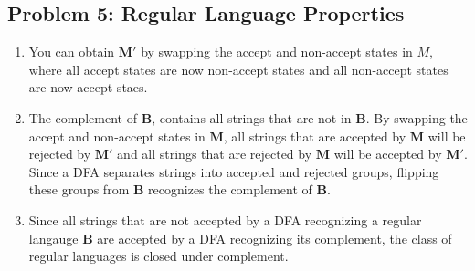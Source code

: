 \documentclass{article}
\begin{document}
\pagebreak

\subsection*{Problem 5: Regular Language Properties}

\begin{enumerate}[label=\Alph*.]
    \item You can obtain $\mathbf{M'}$ by swapping the accept and non-accept states in $M$, where all accept states are now non-accept states and all non-accept states are now accept staes.
    \item The complement of $\mathbf{B}$, contains all strings that are not in $\mathbf{B}$. By swapping the accept and non-accept states in $\mathbf{M}$, all strings that are accepted by $\mathbf{M}$ will be rejected by $\mathbf{M'}$ and all strings that are rejected by $\mathbf{M}$ will be accepted by $\mathbf{M'}$. Since a DFA separates strings into accepted and rejected groups, flipping these groups from $\mathbf{B}$ recognizes the complement of $\mathbf{B}$.
    \item Since all strings that are not accepted by a DFA recognizing a regular langauge $\mathbf{B}$ are accepted by a DFA recognizing its complement, the class of regular languages is closed under complement.
\end{enumerate}
\end{document}
